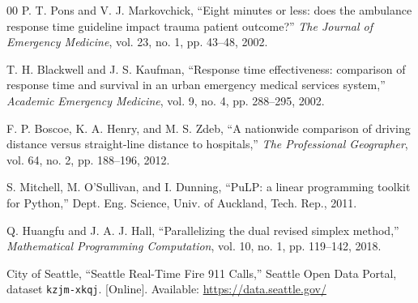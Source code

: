 \documentclass[conference]{IEEEtran}
\begin{document}
\begin{thebibliography}{00}
P. T. Pons and V. J. Markovchick, ``Eight minutes or less: does the ambulance
response time guideline impact trauma patient outcome?'' \emph{The Journal of
Emergency Medicine}, vol. 23, no. 1, pp. 43--48, 2002.

T. H. Blackwell and J. S. Kaufman, ``Response time effectiveness: comparison of
response time and survival in an urban emergency medical services system,''
\emph{Academic Emergency Medicine}, vol. 9, no. 4, pp. 288--295, 2002.

F. P. Boscoe, K. A. Henry, and M. S. Zdeb, ``A nationwide comparison of driving
distance versus straight-line distance to hospitals,'' \emph{The Professional
Geographer}, vol. 64, no. 2, pp. 188--196, 2012.

S. Mitchell, M. O'Sullivan, and I. Dunning, ``PuLP: a linear programming toolkit
for Python,'' Dept. Eng. Science, Univ. of Auckland, Tech. Rep., 2011.

Q. Huangfu and J. A. J. Hall, ``Parallelizing the dual revised simplex method,''
\emph{Mathematical Programming Computation}, vol. 10, no. 1, pp. 119--142, 2018.

City of Seattle, ``Seattle Real-Time Fire 911 Calls,'' Seattle Open Data Portal,
dataset \texttt{kzjm-xkqj}. [Online]. Available:
\url{https://data.seattle.gov/}

\end{thebibliography}
\end{document}
